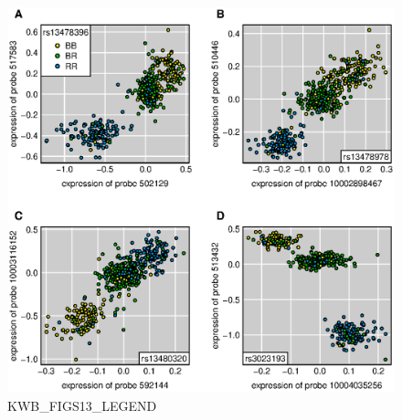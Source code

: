\documentclass[letterpaper,twoside]{article}
\begin{document}
\begin{figure}[p]
\centerline{\includegraphics{SuppFigs/figS13.eps}}

\caption{KWB_FIGS13_LEGEND}
\end{figure}


\clearpage
\end{document}
